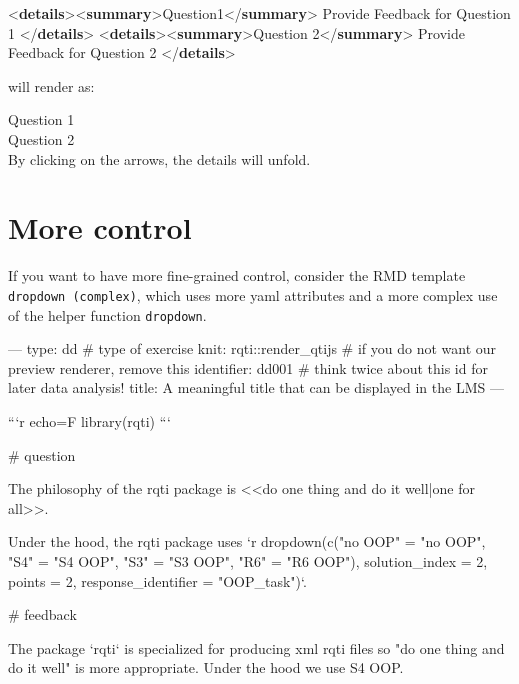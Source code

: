 \documentclass[twoside]{tufte-book}
\newenvironment{Shaded}{}{}
\newcommand{\DataTypeTok}[1]{\textcolor[rgb]{0.56,0.13,0.00}{#1}}
\newcommand{\KeywordTok}[1]{\textcolor[rgb]{0.00,0.44,0.13}{\textbf{#1}}}
\newcommand{\NormalTok}[1]{#1}
\begin{document}
\begin{Shaded}
\begin{Highlighting}[]
\DataTypeTok{\textless{}}\KeywordTok{details}\DataTypeTok{\textgreater{}\textless{}}\KeywordTok{summary}\DataTypeTok{\textgreater{}}\NormalTok{Question1}\DataTypeTok{\textless{}/}\KeywordTok{summary}\DataTypeTok{\textgreater{}}
\NormalTok{  Provide Feedback for Question 1}
\DataTypeTok{\textless{}/}\KeywordTok{details}\DataTypeTok{\textgreater{}}
\DataTypeTok{\textless{}}\KeywordTok{details}\DataTypeTok{\textgreater{}\textless{}}\KeywordTok{summary}\DataTypeTok{\textgreater{}}\NormalTok{Question 2}\DataTypeTok{\textless{}/}\KeywordTok{summary}\DataTypeTok{\textgreater{}}
\NormalTok{  Provide Feedback for Question 2}
\DataTypeTok{\textless{}/}\KeywordTok{details}\DataTypeTok{\textgreater{}}
\end{Highlighting}
\end{Shaded}

will render as:

\noindent\textrightarrow{} Question 1\\
\noindent\textrightarrow{} Question 2\\

By clicking on the arrows, the details will unfold.

\section{More control}\label{more-control-3}

If you want to have more fine-grained control, consider the RMD template \texttt{dropdown\ (complex)}, which uses more yaml attributes and a more complex use of the helper function \texttt{dropdown}.

\begin{Shaded}
\begin{Highlighting}
---
type: dd # type of exercise
knit: rqti::render_qtijs # if you do not want our preview renderer, remove this
identifier: dd001 # think twice about this id for later data analysis!
title: A meaningful title that can be displayed in the LMS
---

```{r echo=F}
library(rqti)
```

# question

The philosophy of the rqti package is <<do one thing and do it well|one for
all>>.

Under the hood, the rqti package uses `r dropdown(c("no OOP" = "no OOP", "S4" =
"S4 OOP", "S3" = "S3 OOP", "R6" = "R6 OOP"), solution_index = 2, points = 2,
response_identifier = "OOP_task")`.

# feedback

The package `rqti` is specialized for producing xml rqti files so "do one thing
and do it well" is more appropriate. Under the hood we use S4 OOP.
\end{Highlighting}
\end{Shaded}
\end{document}

